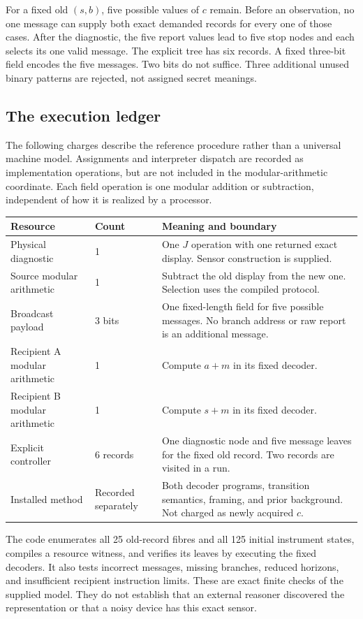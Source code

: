 \documentclass[11pt,letterpaper]{article}
\theoremstyle{plain}
\theoremstyle{definition}
\begin{document}
For a fixed old $(s,b)$, five possible values of $c$ remain. Before an observation, no one message can supply both exact demanded records for every one of those cases. After the diagnostic, the five report values lead to five stop nodes and each selects its one valid message. The explicit tree has six records. A fixed three-bit field encodes the five messages. Two bits do not suffice. Three additional unused binary patterns are rejected, not assigned secret meanings.

\subsection{The execution ledger}
The following charges describe the reference procedure rather than a universal machine model. Assignments and interpreter dispatch are recorded as implementation operations, but are not included in the modular-arithmetic coordinate. Each field operation is one modular addition or subtraction, independent of how it is realized by a processor.

\begin{center}\small
\begin{tabularx}{\textwidth}{@{}P{1.7in}P{.7in}X@{}}\toprule
Resource & Count & Meaning and boundary\\\midrule
Physical diagnostic & 1 & One $J$ operation with one returned exact display. Sensor construction is supplied.\\
Source modular arithmetic & 1 & Subtract the old display from the new one. Selection uses the compiled protocol.\\
Broadcast payload & 3 bits & One fixed-length field for five possible messages. No branch address or raw report is an additional message.\\
Recipient A modular arithmetic & 1 & Compute $a+m$ in its fixed decoder.\\
Recipient B modular arithmetic & 1 & Compute $s+m$ in its fixed decoder.\\
Explicit controller & 6 records & One diagnostic node and five message leaves for the fixed old record. Two records are visited in a run.\\
Installed method & Recorded separately & Both decoder programs, transition semantics, framing, and prior background. Not charged as newly acquired $c$.\\\bottomrule
\end{tabularx}\end{center}

The code enumerates all 25 old-record fibres and all 125 initial instrument states, compiles a resource witness, and verifies its leaves by executing the fixed decoders. It also tests incorrect messages, missing branches, reduced horizons, and insufficient recipient instruction limits. These are exact finite checks of the supplied model. They do not establish that an external reasoner discovered the representation or that a noisy device has this exact sensor.
\end{document}
